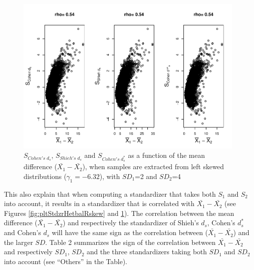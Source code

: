 \documentclass[
  english,
  man]{apa6}
\begin{document}
\begin{figure}
\centering
\includegraphics{Correlation_files/figure-latex/pltStdzrHetbalLskew-1.pdf}
\caption{\label{fig:pltStdzrHetbalLskew}\(S_{Cohen's \; d_s}\), \(S_{Shieh's \; d_s}\) and \(S_{Cohen's \; d^*_s}\) as a function of the mean difference (\(\bar{X_1}-\bar{X_2}\)), when samples are extracted from left skewed distributions (\(\gamma_1 = -6.32\)), with \(SD_1\)=2 and \(SD_2\)=4}
\end{figure}

This also explain that when computing a standardizer that takes both \(S_1\) and \(S_2\) into account, it results in a standardizer that is correlated with \(\bar{X_1}-\bar{X_2}\) (see Figures \ref{fig:pltStdzrHetbalRskew} and \ref{fig:pltStdzrHetbalLskew}). The correlation between the mean difference (\(\bar{X_1}-\bar{X_2}\)) and respectively the standardizer of Shieh's \(d_s\), Cohen's \(d^*_s\) and Cohen's \(d_s\) will have the same sign as the correlation between (\(\bar{X_1}-\bar{X_2}\)) and the larger \(SD\). Table 2 summarizes the sign of the correlation between \(\bar{X_1}-\bar{X_2}\) and respectively \(SD_1\), \(SD_2\) and the three standardizers taking both \(SD_1\) and \(SD_2\) into account (see \enquote{Others} in the Table).
\end{document}
